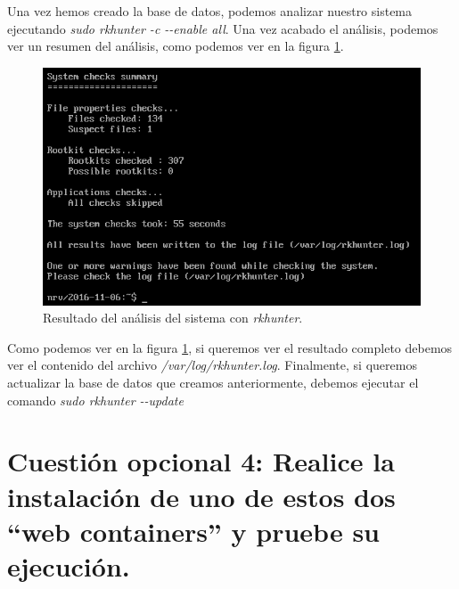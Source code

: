 \documentclass[a4paper,titlepage,12pt]{report}	%
\numberwithin{figure}{section} %
\numberwithin{table}{section} %
\begin{document}
	Una vez hemos creado la base de datos, podemos analizar nuestro sistema ejecutando \textit{sudo rkhunter -c {-}-enable all}. Una vez acabado el análisis, podemos ver un resumen del análisis, como podemos ver en la figura \ref{P2-O3-analisis}.
	\begin{figure}[H]
		\centering
		\includegraphics[scale=0.75]{./Imagenes/P2/O3-analisis.png}
		\caption[Resultado del análisis del sistema con \textit{rkhunter}.]{Resultado del análisis del sistema con \textit{rkhunter}.}
		\label{P2-O3-analisis}
	\end{figure}

	Como podemos ver en la figura \ref{P2-O3-analisis}, si queremos ver el resultado completo debemos ver el contenido del archivo \textit{/var/log/rkhunter.log}. Finalmente, si queremos actualizar la base de datos que creamos anteriormente, debemos ejecutar el comando \textit{sudo rkhunter {-}-update}

	\section[Cuestión opcional 4: Realice la instalación de uno de estos dos “web containers” y pruebe su ejecución.]{Cuestión opcional 4: Realice la instalación de uno de estos dos “web containers” y pruebe su ejecución.}
\end{document}
